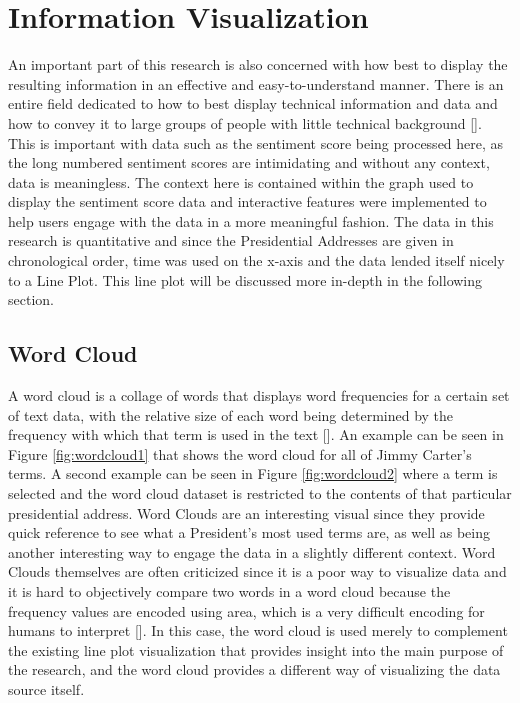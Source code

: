 \section{Information Visualization}
An important part of this research is also concerned with how best to display the resulting information in an effective and easy-to-understand manner.
There is an entire field dedicated to how to best display technical information and data and how to convey it to large groups of people with little technical background [\cite{fekete2008value}].
This is important with data such as the sentiment score being processed here, as the long numbered sentiment scores are intimidating and without any context, data is meaningless.
The context here is contained within the graph used to display the sentiment score data and interactive features were implemented to help users engage with the data in a more meaningful fashion.
The data in this research is quantitative and since the Presidential Addresses are given in chronological order, time was used on the x-axis and the data lended itself nicely to a Line Plot.
This line plot will be discussed more in-depth in the following section.


\subsection{Word Cloud}
A word cloud is a collage of words that displays word frequencies for a certain set of text data, with the relative size of each word being determined by the frequency with which that term is used in the text [\cite{heimerl2014word}].
An example can be seen in Figure \ref{fig:wordcloud1} that shows the word cloud for all of Jimmy Carter's terms.
A second example can be seen in Figure \ref{fig:wordcloud2} where a term is selected and the word cloud dataset is restricted to the contents of that particular presidential address.
Word Clouds are an interesting visual since they provide quick reference to see what a President's most used terms are, as well as being another interesting way to engage the data in a slightly different context.
Word Clouds themselves are often criticized since it is a poor way to visualize data and it is hard to objectively compare two words in a word cloud because the frequency values are encoded using area, which is a very difficult encoding for humans to interpret [\cite{cui2010context}].
In this case, the word cloud is used merely to complement the existing line plot visualization that provides insight into the main purpose of the research, and the word cloud provides a different way of visualizing the data source itself.

